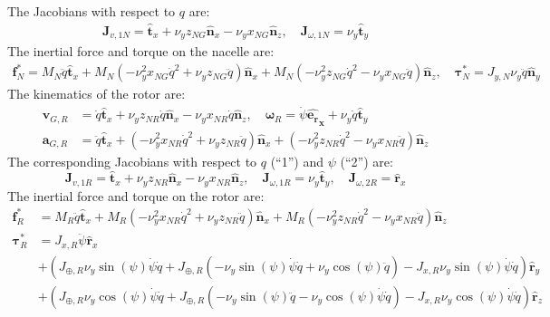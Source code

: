 \documentclass[wes, manuscript]{copernicus}
\renewcommand{\v}[1]{\boldsymbol{#1}}
\begin{document}
The Jacobians with respect to $q$ are:
\begin{align}
\v{J}_{v,1N}=\v{\hat{t}}_x + \nu_y z_{NG}\v{\hat{n}}_x -  \nu_y x_{NG}\v{\hat{n}}_z
, \quad
\v{J}_{\omega,1N}=\nu_y\v{\hat{t}}_y
\end{align}
The inertial force and torque on the nacelle are:
\begin{align}
\v{f}^*_N = 
M_N  \ddot{q}\v{\hat{t}}_x + M_N \left(- \nu_y^{2} x_{NG} \dot{q}^{2} + \nu_y z_{NG} \ddot{q}\right)\v{\hat{n}}_x + M_N \left(- \nu_y^{2} z_{NG} \dot{q}^{2} - \nu_y x_{NG} \ddot{q}\right)\v{\hat{n}}_z
    ,\quad
\v{\tau}_N^* = 
J_{y,N} \nu_y \ddot{q}\v{\hat{n}}_y
\end{align}
The kinematics of the rotor are:
\begin{align}
\v{v}_{G,R} &=
 \dot{q}\v{\hat{t}}_x + \nu_y z_{NR} \dot{q}\v{\hat{n}}_x -  \nu_y x_{NR} \dot{q}\v{\hat{n}}_z
 ,\quad
\v{\omega}_R = \dot{\psi}\mathbf{\hat{e_r}_x} + \nu_y \dot{q}\v{\hat{t}}_y
\\
 \v{a}_{G,R} &= 
 \ddot{q}\v{\hat{t}}_x + (- \nu_y^{2} x_{NR} \dot{q}^{2} + \nu_y z_{NR} \ddot{q})\v{\hat{n}}_x + (- \nu_y^{2} z_{NR} \dot{q}^{2} - \nu_y x_{NR} \ddot{q})\v{\hat{n}}_z
\end{align}
The corresponding Jacobians with respect to $q$ (``1'') and $\psi$ (``2'') are:
\begin{equation*}
\v{J}_{v,1R}=\v{\hat{t}}_x + \nu_y z_{NR}\v{\hat{n}}_x -  \nu_y x_{NR}\v{\hat{n}}_z
,\quad
\v{J}_{\omega,1R}=\nu_y\v{\hat{t}}_y
,\quad
\v{J}_{\omega,2R}=\v{\hat{r}}_x
% 
\end{equation*}
The inertial force and torque on the rotor are:
\begin{align}
\v{f}^*_R &= 
M_{R}  \ddot{q}\v{\hat{t}}_x + M_{R} \left(- \nu_y^{2} x_{NR} \dot{q}^{2} + \nu_y z_{NR} \ddot{q}\right)\v{\hat{n}}_x + M_{R} \left(- \nu_y^{2} z_{NR} \dot{q}^{2} - \nu_y x_{NR} \ddot{q}\right)\v{\hat{n}}_z
\\
\v{\tau}^*_R &= 
J_{x,R} \ddot{\psi}\v{\hat{r}}_x \\
&+ (J_{\oplus,R} \nu_y \sin\left(\psi\right) \dot{\psi} \dot{q} + J_{\oplus,R} \left(- \nu_y \sin\left(\psi\right) \dot{\psi} \dot{q} + \nu_y \cos\left(\psi\right) \ddot{q}\right) 
   - J_{x,R} \nu_y \sin\left(\psi\right) \dot{\psi} \dot{q})\v{\hat{r}}_y 
\\
&+ (J_{\oplus,R} \nu_y \cos\left(\psi\right) \dot{\psi} \dot{q}
+ J_{\oplus,R} \left(- \nu_y \sin\left(\psi\right) \ddot{q} - \nu_y \cos\left(\psi\right) \dot{\psi} \dot{q}\right) - J_{x,R} \nu_y \cos\left(\psi\right) \dot{\psi} \dot{q})\v{\hat{r}}_z
\end{align}
\end{document}

